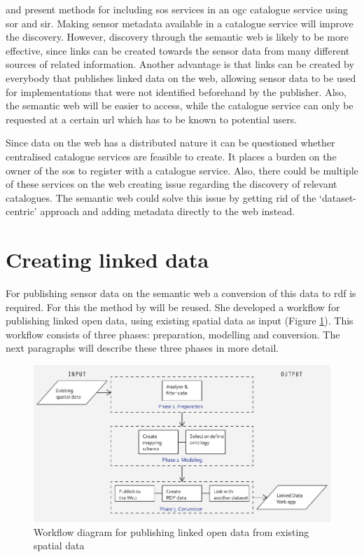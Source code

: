 \cite{SW:OGC4} and \cite{SW:OGC3} present methods for including \ac{sos} services in an \ac{ogc} catalogue service using \ac{sor} and \ac{sir}. Making sensor metadata available in a catalogue service will improve the discovery. However, discovery through the semantic web is likely to be more effective, since links can be created towards the sensor data from many different sources of related information. Another advantage is that links can be created by everybody that publishes linked data on the web, allowing sensor data to be used for implementations that were not identified beforehand by the publisher. Also, the semantic web will be easier to access, while the catalogue service can only be requested at a certain \ac{url} which has to be known to potential users. 

Since data on the web has a distributed nature it can be questioned whether centralised catalogue services are feasible to create. It places a burden on the owner of the \ac{sos} to register with a catalogue service. Also, there could be multiple of these services on the web creating issue regarding the discovery of relevant catalogues. The semantic web could solve this issue by getting rid of the `dataset-centric' approach and adding metadata directly to the web instead.

\section{Creating linked data}
\label{par:missier}
For publishing sensor data on the semantic web a conversion of this data to \ac{rdf} is required. For this the method by \cite{LD:Missier} will be reused. She developed a workflow for publishing linked open data, using existing spatial data as input (Figure \ref{fig:missier}). This workflow consists of three phases: preparation, modelling and conversion. The next paragraphs will describe these three phases in more detail.

\begin{figure}
	\centering
	\includegraphics[width=1\linewidth]{UML/workflowMissier.png}
	\caption{Workflow diagram for publishing linked open data from existing spatial data \citep[p. 28]{LD:Missier}}
	\label{fig:missier}
\end{figure}

